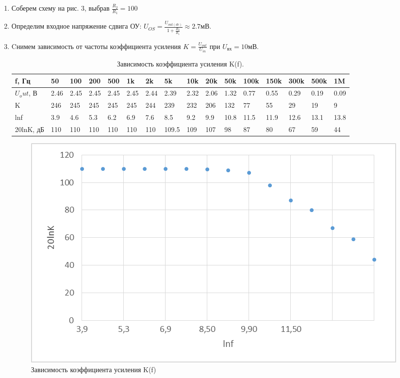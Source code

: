 \documentclass[a4paper]{article}
\begin{document}
\begin{enumerate}
\item Соберем схему на рис. 3, выбрав $\frac{R_2}{R_1} = 100$
 
\item Определим входное напряжение сдвига ОУ: $U_{OS} =\frac{U_{out(dc)}}{1+\frac{R_2}{R_1}} \approx 2.7 мВ$.
\item Cнимем зависимость от частоты коэффициента усиления $K = \frac{U_{out}}{U_{in}}$ при $U_{вх} = 10мВ$.

\begin{table}[H]
    \centering
    \begin{center}
    \end{center}
    \vspace{0.1cm}
    \label{tab:my_label}
    \begin{tabular}{|p{2cm}|p{1cm}|p{1cm}|p{1cm}|p{1cm}|p{1cm}|p{1cm}|p{1cm}|p{1cm}|p{1cm}|p{1cm}|p{1cm}|p{1cm}|p{1cm}|p{1cm}|p{1cm}|}
        \hline
        f, Гц & 50    & 100   & 200 & 500 & 1k    & 2k    & 5k    & 10k    & 20k    & 50k  & 100k & 150k &300k &500k & 1M \\ 
        \hline
        $U_out$, В  & 2.46 & 2.45 & 2.45 & 2.45  & 2.45  & 2.44  & 2.39  & 2.32   & 2.06  & 1.32 & 0.77  & 0.55 & 0.29 & 0.19 & 0.09\\
        \hline
        K    & 246 & 245 & 245  & 245  & 245   & 244   & 239    & 232    & 206   & 132 & 77 & 55 &  29 & 19 & 9 \\
        \hline
        lnf     & 3.9   & 4.6  & 5.3  & 6.2 & 6.9  & 7.6 & 8.5   & 9.2  & 9.9 &  10.8 & 11.5 & 11.9 & 12.6 & 13.1 & 13.8 \\
        \hline
        20lnK, дБ   & 110   & 110  & 110 & 110 &  110  & 110  & 109.5 &  109 & 107  & 98 & 87 & 80 & 67 & 59 & 44 \\
        \hline 
        \end{tabular}
        \caption{Зависимость коэффициента усиления K(f).}
\end{table}


\begin{figure}[H]
    \begin{center}
        \includegraphics[scale = 0.5]{диаграмма_2.png}
        \caption{Зависимость коэффициента усиления K(f)}
        \label{Sallen-Ki}
    \end{center}
\end{figure}


\end{enumerate}
\end{document}
